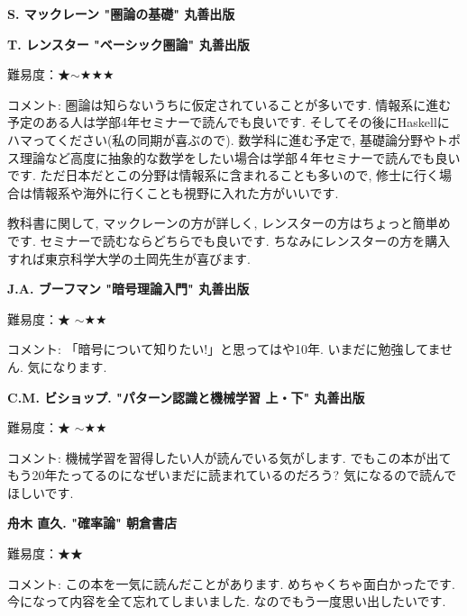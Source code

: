 \textbf{S. マックレーン "圏論の基礎" 丸善出版}  　\vspace{-6pt} 

\textbf{T. レンスター "ベーシック圏論" 丸善出版}  　\vspace{-6pt} 

難易度：★$\sim$★★★ \vspace{-6pt} 

コメント: 圏論は知らないうちに仮定されていることが多いです. 情報系に進む予定のある人は学部4年セミナーで読んでも良いです.  そしてその後にHaskellにハマってください(私の同期が喜ぶので). 数学科に進む予定で, 基礎論分野やトポス理論など高度に抽象的な数学をしたい場合は学部４年セミナーで読んでも良いです. ただ日本だとこの分野は情報系に含まれることも多いので, 修士に行く場合は情報系や海外に行くことも視野に入れた方がいいです. 

教科書に関して, マックレーンの方が詳しく, レンスターの方はちょっと簡単めです. セミナーで読むならどちらでも良いです. ちなみにレンスターの方を購入すれば東京科学大学の土岡先生が喜びます. 
\vspace{8pt}

\textbf{J.A. ブーフマン "暗号理論入門" 丸善出版}  　\vspace{-6pt} 

難易度：★ $\sim$★★\vspace{-6pt} 

コメント: 「暗号について知りたい!」と思ってはや10年. いまだに勉強してません. 気になります. 
\vspace{8pt}


\textbf{C.M. ビショップ. "パターン認識と機械学習 上・下" 丸善出版}  　\vspace{-6pt} 

難易度：★ $\sim$★★\vspace{-6pt} 

コメント: 機械学習を習得したい人が読んでいる気がします. でもこの本が出てもう20年たってるのになぜいまだに読まれているのだろう? 気になるので読んでほしいです. 
\vspace{8pt}

\textbf{舟木 直久. "確率論" 朝倉書店}  　\vspace{-6pt} 

難易度：★★\vspace{-6pt} 

コメント: この本を一気に読んだことがあります. めちゃくちゃ面白かったです. 今になって内容を全て忘れてしまいました. なのでもう一度思い出したいです. 
\vspace{8pt}

